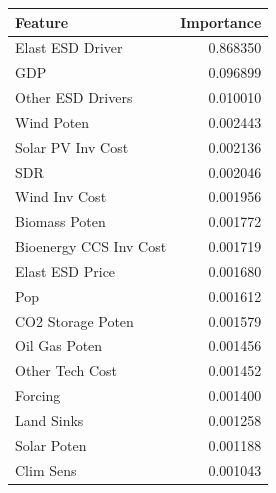 \begin{tabular}{lr}
\toprule
Feature & Importance \\
\midrule
Elast ESD Driver & 0.868350 \\
GDP & 0.096899 \\
Other ESD Drivers & 0.010010 \\
Wind Poten & 0.002443 \\
Solar PV Inv Cost & 0.002136 \\
SDR & 0.002046 \\
Wind Inv Cost & 0.001956 \\
Biomass Poten & 0.001772 \\
Bioenergy CCS Inv Cost & 0.001719 \\
Elast ESD Price & 0.001680 \\
Pop & 0.001612 \\
CO2 Storage Poten & 0.001579 \\
Oil Gas Poten & 0.001456 \\
Other Tech Cost & 0.001452 \\
Forcing & 0.001400 \\
Land Sinks & 0.001258 \\
Solar Poten & 0.001188 \\
Clim Sens & 0.001043 \\
\bottomrule
\end{tabular}
